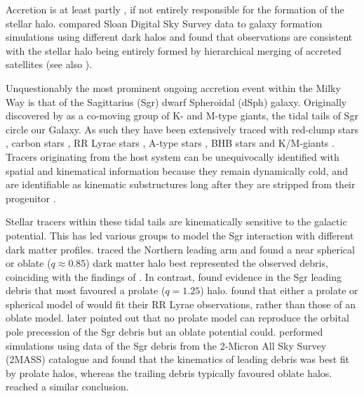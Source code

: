 \documentclass[preprint2]{aastex}
\begin{document}
 Accretion is at least partly \citep[e.g.,][]{Starkenburg;et-al_2009}, if not entirely responsible for the formation of the stellar halo. \citet{Bell;et-al_2008} compared Sloan Digital Sky Survey \citep[hereafter SDSS]{York;et-al_2000} data to galaxy formation simulations using different dark halos and found that observations are consistent with the stellar halo being entirely formed by hierarchical merging of accreted satellites (see also \citet{Xue;et-al_2011}).
	
Unquestionably the most prominent ongoing accretion event within the Milky Way is that of the Sagittarius (Sgr) dwarf Spheroidal (dSph) galaxy. Originally discovered by \citet{Ibata;et-al_1994} as a co-moving group of K- and M-type giants, the tidal tails of Sgr circle our Galaxy. As such they have been extensively traced with red-clump stars \citep{Majewski;et-al_1999}, carbon stars \citep{Totten;Irwin_1998, Ibata;et-al_2001}, RR Lyrae stars \citep{Ivezic;et-al_2000, Vivas;et-al_2005, Keller;et-al_2008, Watkins;et-al_2009, Prior;et-al_2009b}, A-type stars \citep{Newberg;et-al_2003}, BHB stars \citep{Ruhland;et-al_2011} and K/M-giants \citep{Majewski;et-al_2003,  Yanny;et-al_2009, Keller;Yong;Da_Costa_2010}. Tracers originating from the host system can be unequivocally identified with spatial and kinematical information because they remain dynamically cold, and are identifiable as kinematic substructures long after they are stripped from their progenitor \citep[for example][]{Ibata;Lewis_1998, Helmi;White_1999}. 
	
Stellar tracers within these tidal tails are kinematically sensitive to the galactic potential. This has led various groups to model the Sgr interaction with different dark matter profiles. \citet{Martinez-Delgado;et-al_2004} traced the Northern leading arm and found a near spherical or oblate ($q \approx 0.85$) dark matter halo best represented the observed debris, coinciding with the findings of \citet{Ibata;et-al_2001}. In contrast, \citet{Helmi_2004} found evidence in the Sgr leading debris that most favoured a prolate ($q = 1.25$) halo. \citet{Vivas;et-al_2005} found that either a prolate or spherical model of  \citet{Helmi_2004} would fit their RR Lyrae observations, rather than those of an oblate model. \citet{Johnston;et-al_2005} later pointed out that no prolate model can reproduce the orbital pole precession of the Sgr debris but an oblate potential could. \citet[hereafter LJM05]{Law;et-al_2005} performed simulations using data of the Sgr debris from the 2-Micron All Sky Survey (2MASS) catalogue and found that the kinematics of leading debris was best fit by prolate halos, whereas the trailing debris typically favoured oblate halos. \citet{Prior;et-al_2009a} reached a similar conclusion.
	
\end{document}
